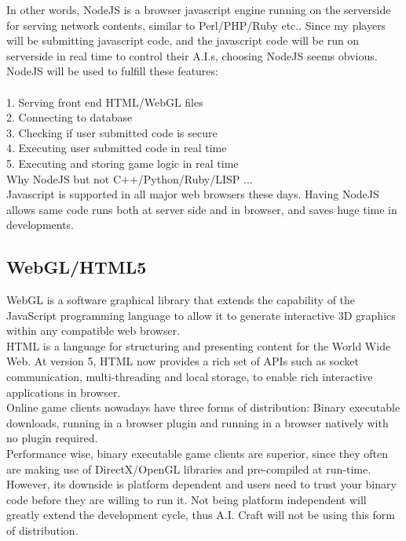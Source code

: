 \documentclass[12pt]{article}
\begin{document}
In other words, NodeJS is a browser javascript engine running on the serverside for serving network contents, similar to Perl/PHP/Ruby etc.. Since my players will be submitting javascript code, and the javascript code will be run on serverside in real time to control their A.I.s, choosing NodeJS seems obvious. NodeJS will be used to fulfill these features:\\
\\
1. Serving front end HTML/WebGL files\\
2. Connecting to database\\
3. Checking if user submitted code is secure\\
4. Executing user submitted code in real time\\
5. Executing and storing game logic in real time\\

Why NodeJS but not C++/Python/Ruby/LISP ... \\
Javascript is supported in all major web browsers these days. Having NodeJS allows same code runs both at server side and in browser, and saves huge time in developments.\\

\subsection{WebGL/HTML5}
WebGL is a software graphical library that extends the capability of the JavaScript programming language to allow it to generate interactive 3D graphics within any compatible web browser. \\

HTML is a language for structuring and presenting content for the World Wide Web. At version 5, HTML now provides a rich set of APIs such as socket communication, multi-threading and local storage, to enable rich interactive applications in browser.\\

Online game clients nowadays have three forms of distribution: Binary executable downloads, running in a browser plugin and running in a browser natively with no plugin required.\\ 

Performance wise, binary executable game clients are superior, since they often are making use of DirectX/OpenGL libraries and pre-compiled at run-time. However, its downside is platform dependent and users need to trust your binary code before they are willing to run it. Not being platform independent will greatly extend the development cycle, thus A.I. Craft will not be using this form of distribution.\\ 
\end{document}
